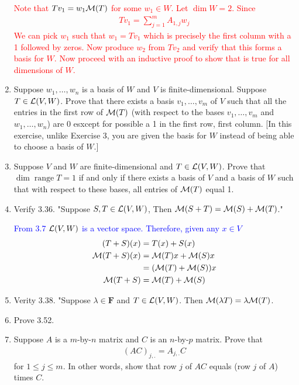 \documentclass[10pt,a4paper]{report}
\DeclareMathOperator{\RANGE}{range}
\newcommand{\RED}[1]{\textcolor{red}{#1}}
\newcommand{\BLUE}[1]{\textcolor{blue}{#1}}
\newcommand{\F}{\textbf{F}}
\begin{document}
\begin{enumerate}
\RED{Note that $Tv_1=w_1\mathcal{M}(T)$ for some $w_1 \in W$. Let $\dim W=2$. Since
\begin{align*}
	Tv_1 = \sum_{j=1}^m A_{1,j}w_j
\end{align*}We can pick $w_1$ such that $w_1=Tv_1$ which is precisely the first column with a 1 followed by zeros.  Now produce $w_2$ from $Tv_2$ and verify that this forms a basis for $W$.  Now proceed with an inductive proof to show that is true for all dimensions of $W$.
}

\item Suppose $w_1, \dots, w_n$ is a basis of $W$ and $V$ is finite-dimensional.  Suppose $T \in \mathcal{L}(V,W)$.  Prove that there exists a basis $v_1, \dots, v_m$ of $V$ such that all the entries in the first row of $\mathcal{M}(T)$ (with respect to the bases $v_1,\dots,v_m$ and $w_1, \dots, w_n$) are 0 esxcept for possible a 1 in the first row, first column. $[$In this exercise, unlike Exercise 3, you are given the basis for $W$ instead of being able to choose a basis of $W.]$

\item Suppose $V$ and $W$ are finite-dimensional and $T \in \mathcal{L}(V,W)$.  Prove that $\dim \RANGE T =  1$ if and only if there exists a basis of $V$ and a basis of $W$ such that with respect to these bases, all entries of $\mathcal{M}(T)$ equal 1.

\item Verify 3.36.  "Suppose $S,T\in \mathcal{L}(V,W)$, Then $\mathcal{M}(S+T)=\mathcal{M}(S)+\mathcal{M}(T)$."

\BLUE{From 3.7 $\mathcal{L}(V,W)$ is a vector space.  Therefore, given any $x \in V$ \begin{align*}
	(T+S)(x) &= T(x)+S(x) \\
	\mathcal{M}(T+S)(x) &= \mathcal{M}(T)x+\mathcal{M}(S)x \\
	&= (\mathcal{M}(T)+\mathcal{M}(S))x \\
	\mathcal{M}(T+S) &= \mathcal{M}(T) + \mathcal{M}(S)
\end{align*}
}

\item Verity 3.38. "Suppose $\lambda \in \F$ and $T \in \mathcal{L}(V,W)$.  Then $\mathcal{M}(\lambda T) = \lambda\mathcal{M}(T)$.

\item Prove 3.52.

\item Suppose $A$ is a $m$-by-$n$ matrix and $C$ is an $n$-by-$p$ matrix.  Prove that 
\begin{align*}
	(AC)_{j,.} = A_{j,.}C
\end{align*}for $1 \le j\le m$.  In other words, show that row $j$ of $AC$ equals (row $j$ of $A$) times $C$.


\end{enumerate}
\end{document}
